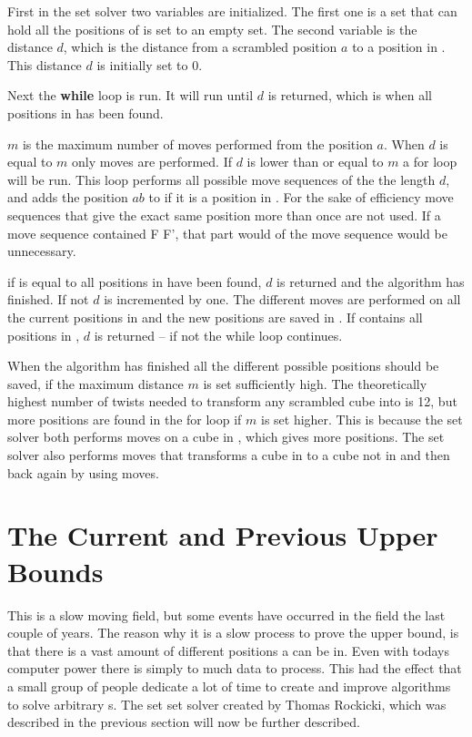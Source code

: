 First in the set solver two variables are initialized. The first one  is a set that can hold all the positions of  is set to an empty set. The second variable is the distance $d$, which is the distance from a scrambled position $a$ to a position in . This distance $d$ is initially set to $0$.

Next the \textbf{while} loop is run. It will run until $d$ is returned, which is when all positions in  has been found.

$m$ is the maximum number of  moves performed from the position $a$. When $d$ is equal to $m$ only  moves are performed.
If $d$ is lower than or equal to $m$ a for loop will be run. This loop performs all possible move sequences of the the length $d$, and adds the position $ab$ to  if it is a position in .%
For the sake of efficiency move sequences that give the exact same position more than once are not used. If a move sequence contained F F', that part would  of the move sequence would be unnecessary. 

if  is equal to  all positions in  have been found, $d$ is returned and the algorithm has finished. 
If not $d$ is incremented by one. 
The different  moves are performed on all the current  positions in  and the new  positions are saved in .
If  contains all positions in , $d$ is returned -- if not the while loop continues.


When the algorithm has finished all the different possible  positions should be saved, if the maximum distance $m$ is set sufficiently high. The theoretically highest number of twists needed to transform any scrambled cube into  is 12, but more positions are found in the for loop if $m$ is set higher. This is because the set solver both performs  moves on a cube in , which gives more  positions. The set solver also performs moves that transforms a cube in  to a cube not in  and then back again by using  moves.

\section{The Current and Previous Upper Bounds}
This is a slow moving field, but some events have occurred in the field the last couple of years.%
The reason why it is a slow process to prove the upper bound, is that there is a vast amount of different positions a \rubik{} can be in. Even with todays computer power there is simply to much data to process. This had the effect that a small group of people dedicate a lot of time to create and improve algorithms to solve arbitrary \rubik{}s. The set set solver created by Thomas Rockicki, which was described in the previous section will now be further described.

